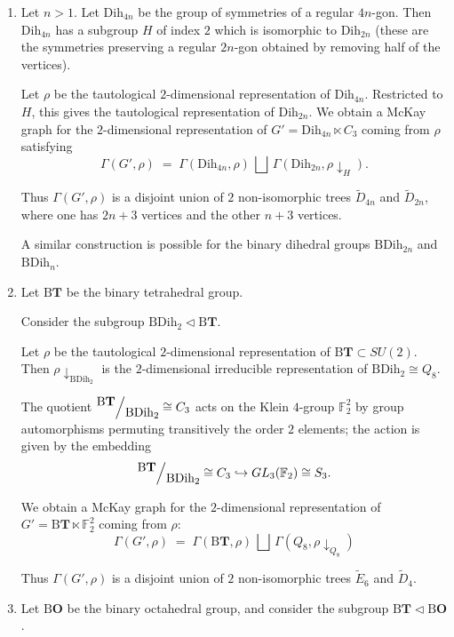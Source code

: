 \documentclass[ALCO]{cedram}
\def\quotient#1#2{
    \raise1ex\hbox{$#1$}\Big/\lower1ex\hbox{$#2$}
}
\begin{document}
\begin{exam}
\mbox{}
\begin{enumerate}
\item  {Let $n>1$.} Let $\mathrm{Dih}_{4n}$ be the group of symmetries of a regular $4n$-gon. Then $\mathrm{Dih}_{4n}$ has a subgroup $H$ of index $2$ which is isomorphic to $\mathrm{Dih}_{2n}$ (these are the symmetries preserving {a regular $2n$-gon obtained by removing half of the vertices}).
 
 Let $\rho$ be the tautological $2$-dimensional representation of $\mathrm{Dih}_{4n}$. Restricted to $H$, this gives the tautological representation of $\mathrm{Dih}_{2n}$. 
 We obtain a McKay graph for the $2$-dimensional representation of $G'=\mathrm{Dih}_{4n} \ltimes {C}_3$ coming from $\rho$ {satisfying} $$\Gamma(G', \rho) \;=\; \Gamma(\mathrm{Dih}_{4n}, \rho) \,\bigsqcup\, \Gamma(\mathrm{Dih}_{2n}, \rho\downarrow_H).$$
 
 Thus $\Gamma(G', \rho)$ is a {disjoint} union of $2$ non-isomorphic trees $\tilde{D}_{{4}n}$ and $\tilde{D}_{{2}n}$,
where one has  ${2n} + 3$ vertices and the other ${n} + 3$ vertices.

A similar construction is possible for the binary dihedral groups $\mathrm{BDih}_{2n}$ and $\mathrm{BDih}_n$.
    \item Let $\mathrm{B}\mathbf{T}$ be the binary tetrahedral group. {Consider the subgroup $\mathrm{BDih}_2 \triangleleft \mathrm{B}\mathbf{T}$.
 
  Let $\rho$ be the tautological $2$-dimensional representation of $\mathrm{B}\mathbf{T}\subset SU(2)$. Then $\rho\downarrow_{\mathrm{BDih}_2}$ is the $2$-dimensional irreducible representation of $\mathrm{BDih}_2 \cong Q_8$.}
  
  The quotient $\quotient{\mathrm{B}\mathbf{T}}{\mathrm{BDih}_2} \cong C_3$ acts on the Klein $4$-group $\mathbb{F}_2^2$ by group automorphisms permuting transitively the order $2$ elements; the action is given by the embedding $$\quotient{\mathrm{B}\mathbf{T}}{\mathrm{BDih}_2} \cong C_3 \hookrightarrow GL_3(\mathbb{F}_2) \cong S_3.$$


 
 We obtain a McKay graph for the $2$-dimensional representation of $G'=\mathrm{B}\mathbf{T}\ltimes \mathbb{F}_2^2$ coming from $\rho$: $$\Gamma(G', \rho) \; =\; \Gamma(\mathrm{B}\mathbf{T}, \rho) \,\bigsqcup \,\Gamma(Q_8, \rho\downarrow_{Q_8})$$
 
 Thus $\Gamma(G', \rho)$ is a disjoint union of $2$ non-isomorphic trees $\widetilde{E}_6$ and $\widetilde{D}_4$.
 \item  Let $\mathrm{B}\mathbf{O}$ be the binary octahedral group, and consider the subgroup $ \mathrm{B}\mathbf{T} \triangleleft \mathrm{B}\mathbf{O}$.
 

\end{enumerate}
\end{exam}
\end{document}
